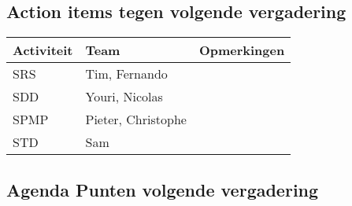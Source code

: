 \subsection{Action items tegen volgende vergadering}
\begin{table} [H]
	\centering
	\begin{tabular} {l|ll}
		\textbf{Activiteit} & \textbf{Team} & \textbf{Opmerkingen} \\
		\hline
		SRS & Tim, Fernando & \\
		SDD & Youri, Nicolas & \\
		SPMP & Pieter, Christophe & \\
		STD & Sam & \\
	\end{tabular}
\end{table}
\subsection{Agenda Punten volgende vergadering}

